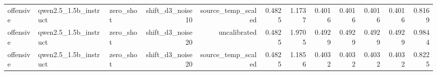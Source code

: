 \begin{table}[htbp]
{\begin{tabular}{lllrrrrrrrrr}
offensive & qwen2.5\_1.5b\_instruct & zero\_shot & shift\_d3\_noise10 & source\_temp\_scaled & 0.4825 & 1.1737 & 0.4016 & 0.4016 & 0.4016 & 0.4016 & 0.8169 \\
offensive & qwen2.5\_1.5b\_instruct & zero\_shot & shift\_d3\_noise20 & uncalibrated & 0.4825 & 1.9705 & 0.4929 & 0.4929 & 0.4929 & 0.4929 & 0.9844 \\
offensive & qwen2.5\_1.5b\_instruct & zero\_shot & shift\_d3\_noise20 & source\_temp\_scaled & 0.4825 & 1.1856 & 0.4032 & 0.4032 & 0.4032 & 0.4032 & 0.8225 \\
\bottomrule
\end{tabular}%
}
\end{table}